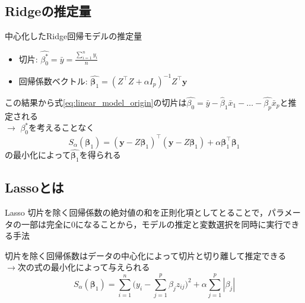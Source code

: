 \documentclass[dvipdfmx, 10pt]{beamer}
\begin{document}
\subsection{Ridgeの推定量}
\begin{frame}{\insertsubsection}
	中心化したRidge回帰モデルの推定量
	\begin{itemize}
	\item 切片: $\hat{\beta_0^*} = \bar{y} = \frac{\sum_{i=1}^{n}{y_i}}{n}$
	\item 回帰係数ベクトル: $\hat{\bm{\beta}_1} = (Z^{\top}Z + \alpha I_p)^{-1} Z^{\top} \bm{y}$
	\end{itemize}
    \vspace{10pt}
    この結果から式\eqref{eq:linear_model_origin}の切片は$\hat{\beta_0} = \bar{y} - \hat{\beta}_1 \bar{x}_1 - \dots - \hat{\beta_p} \bar{x}_p$と推定される\\
    \vspace{10pt}
    $\rightarrow$ \quad $\beta_0^*$を考えることなく
\begin{equation}
	S_{\alpha}(\bm{\beta}_1) = (\bm{y} - Z \bm{\beta}_1)^{\top}  (\bm{y} - Z\bm{\beta}_1) + \alpha \bm{\beta}_1^{\top} \bm{\beta}_1
	\label{eq:ridge_estimate_beta1hat}
\end{equation}
の最小化によって$\hat{\bm{\beta}_1}$を得られる
\end{frame}

\subsection{Lassoとは}
\begin{frame}{\insertsubsection}
    \begin{block}{Lasso}
        切片を除く回帰係数の絶対値の和を正則化項としてとることで，パラメータの一部は完全に0になることから，モデルの推定と変数選択を同時に実行できる手法
    \end{block}
    \vspace{10pt}
    切片を除く回帰係数はデータの中心化によって切片と切り離して推定できる\\
    $\rightarrow$次の式の最小化によって与えられる
    \begin{equation}
        S_{\alpha}(\bm\beta_1) = \sum_{i=1}^{n} \bigl(
        	y_i - \sum_{j=1}^{p} \beta_j z_{ij}
        \bigr)^2 + \alpha \sum_{j=1}^{p}|\beta_j|
    \end{equation}
\end{frame}
\end{document}
